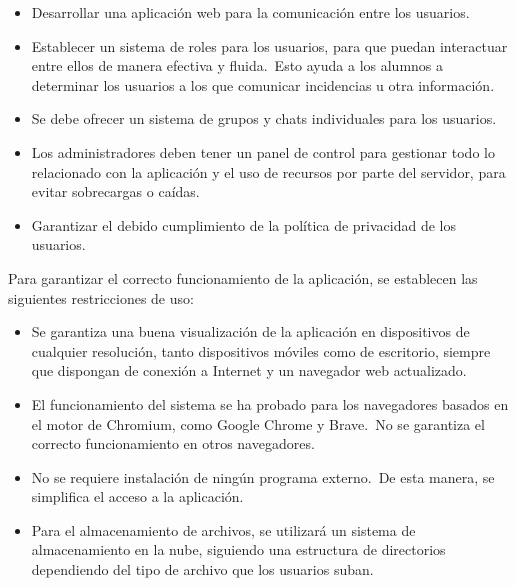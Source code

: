 \begin{itemize}
	\item Desarrollar una aplicación web para la comunicación entre los usuarios.
	\item Establecer un sistema de roles para los usuarios, para que puedan interactuar entre ellos de manera
	efectiva y fluida.\ Esto ayuda a los alumnos a determinar los usuarios a los que comunicar incidencias u otra
	información.
	\item Se debe ofrecer un sistema de grupos y chats individuales para los usuarios.
	\item Los administradores deben tener un panel de control para gestionar todo lo relacionado con la aplicación
	y el uso de recursos por parte del servidor, para evitar sobrecargas o caídas.
	\item Garantizar el debido cumplimiento de la política de privacidad de los usuarios.
\end{itemize}
\label{itm:alcance_objetivos}


Para garantizar el correcto funcionamiento de la aplicación, se establecen las siguientes restricciones de uso:

\begin{itemize}
	\item Se garantiza una buena visualización de la aplicación en dispositivos de cualquier resolución, tanto
	dispositivos móviles como de escritorio, siempre que dispongan de conexión a Internet y un navegador web
	actualizado.
	\item El funcionamiento del sistema se ha probado para los navegadores basados en el motor de
	Chromium, como Google Chrome y Brave.\ No se garantiza el correcto funcionamiento en otros navegadores.
	\item No se requiere instalación de ningún programa externo.\ De esta manera, se
	simplifica el acceso a la aplicación.
	\item Para el almacenamiento de archivos, se utilizará un sistema de almacenamiento en la nube, siguiendo
	una estructura de directorios dependiendo del tipo de archivo que los usuarios suban.
\end{itemize}
\label{itm:alcance_limitaciones}



